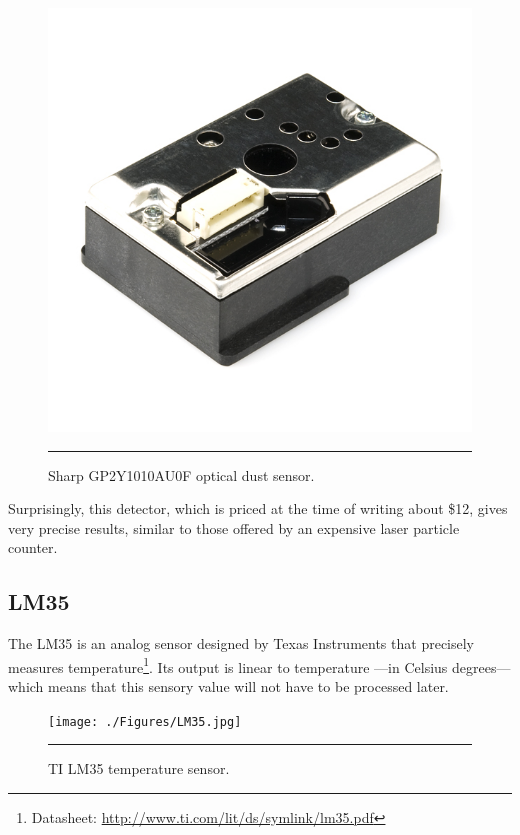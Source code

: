 \begin{figure}[htbp]
    \centering
        \includegraphics{./Figures/sharp.jpg}
        \rule{35em}{0.5pt}
    \caption[Sharp GP2Y1010AU0F]{Sharp GP2Y1010AU0F optical dust sensor.}
    \label{fig:SharpGP2Y1010AU0F}
\end{figure}

Surprisingly, this detector, which is priced at the time of writing about \$12, gives very precise results, similar to those offered by an expensive laser particle counter\citep{airquality}.


\subsection{LM35}
\label{sub:lm35}

The LM35 is an analog sensor designed by Texas Instruments that precisely measures temperature\footnote{Datasheet: \url{http://www.ti.com/lit/ds/symlink/lm35.pdf}}. Its output is linear to temperature ---in Celsius degrees--- which means that this sensory value will not have to be processed later.

\begin{figure}[htbp]
    \centering
        \texttt{[image: ./Figures/LM35.jpg]}
        \rule{35em}{0.5pt}
    \caption[TI LM35 temperature sensor]{TI LM35 temperature sensor.}
    \label{fig:lm35}
\end{figure}

